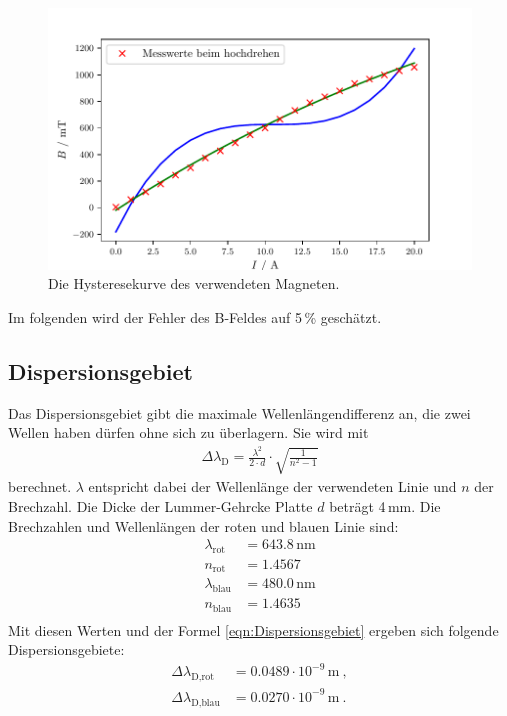 \begin{figure}[H]
  \centering
  \includegraphics[width=\linewidth]{Bilder/Hysterese.pdf}
  \caption{Die Hysteresekurve des verwendeten Magneten.}
  \label{fig:Hysterese}
\end{figure}

Im folgenden wird der Fehler des B-Feldes auf 5\,\% geschätzt.


\subsection{Dispersionsgebiet}
Das Dispersionsgebiet gibt die maximale Wellenlängendifferenz an, die zwei Wellen haben dürfen ohne sich zu überlagern. Sie wird mit
\begin{align}
  \Delta\lambda_\text{D} = \frac{\lambda^2}{2\cdot d} \cdot \sqrt{\frac{1}{n^2 - 1}}
  \label{eqn:Dispersionsgebiet}
\end{align}
berechnet. $\lambda$ entspricht dabei der Wellenlänge der verwendeten Linie und $n$ der Brechzahl. Die Dicke der Lummer-Gehrcke Platte $d$ beträgt 4\,mm. Die Brechzahlen und Wellenlängen der roten und blauen Linie sind:
\begin{align*}
  \lambda_\text{rot} &= 643.8\,\text{nm} \\
  n_\text{rot} &= 1.4567 \\
  \lambda_\text{blau} &= 480.0\,\text{nm} \\
  n_\text{blau} &= 1.4635 \\
\end{align*}
Mit diesen Werten und der Formel \eqref{eqn:Dispersionsgebiet} ergeben sich folgende Dispersionsgebiete:
\begin{align*}
  \Delta\lambda_\text{D,rot} &= 0.0489 \cdot 10^{-9}\,\text{m}\ , \\
  \Delta\lambda_\text{D,blau} &= 0.0270 \cdot 10^{-9}\,\text{m}\ .
\end{align*}



